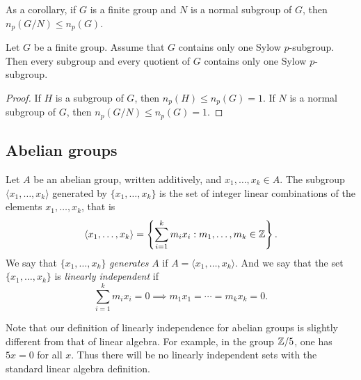 As a corollary, if $G$ is a finite group and
$N$ is a normal subgroup of $G$, then 
$n_p(G/N)\leq n_p(G)$.

\begin{corollary}
Let $G$ be a finite group. Assume that 
$G$ contains only one Sylow $p$-subgroup. Then
every subgroup and every quotient of 
$G$ 
contains only one Sylow 
$p$-subgroup. 
\end{corollary}

\begin{proof}
    If $H$ is a subgroup of $G$, then
    $n_p(H)\leq n_p(G)=1$. If $N$ is a normal subgroup of 
    $G$, then $n_p(G/N)\leq n_p(G)=1$.
\end{proof}

%
%

\subsection{Abelian groups}

Let $A$ be an abelian group, written additively, and $x_1,\dots,x_k\in A$. 
The subgroup $\langle x_1,\dots,x_k\rangle$ 
generated by $\{x_1,\dots,x_k\}$
is the set of integer linear combinations of the elements 
$x_1,\dots,x_k$, that is
\[ 
\langle x_1,\dots,x_k\rangle=\left\{ 
\sum_{i=1}^k m_ix_i: m_1,\dots,m_k\in\mathbb{Z}\right\}.
\]
We say that $\{x_1,\dots,x_k\}$ \emph{generates} $A$ if 
$A=\langle x_1,\dots,x_k\rangle$. And we say that the set 
$\{x_1,\dots,x_k\}$ is 
\emph{linearly independent} if 
\[
\sum_{i=1}^k m_ix_i=0\implies m_1x_1=\cdots=m_kx_k=0.
\]

Note that our definition of linearly independence for abelian groups is slightly 
different from that of linear algebra. For example, in the group $\mathbb{Z}/5$, 
one has $5x=0$ for all $x$. Thus there will be no linearly independent sets with 
the standard linear algebra definition. 

